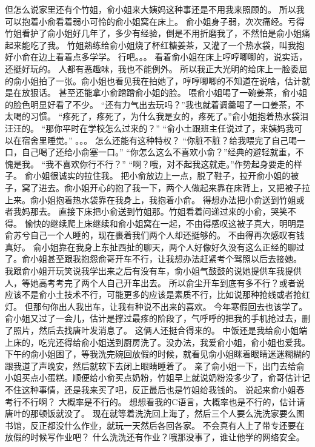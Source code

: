 但怎么说家里还有个竹姐，俞小姐来大姨妈这种事还是不用我来照顾的。
所以我可以抱着小俞看着弱小可怜的俞小姐窝在床上。
俞小姐身子弱，次次痛经。亏得竹姐看护了俞小姐好几年了，多少有经验，倒是不用折磨我了，不然怕是俞小姐痛起来能吃了我。
竹姐熟练给俞小姐烧了杯红糖姜茶，又灌了一个热水袋，叫我抱好小俞在边上看着点多学学。
行吧。。。
看着俞小姐在床上哼哼唧唧的，说实话，还挺好玩的。
人都有恶趣味，我也不能例外。
所以我正大光明的给床上一脸委屈的俞小姐拍了一张。俞小姐也看见我在拍她了，哼哼唧唧的不知道在说啥，估计就是在放狠话。
甚至还能拿小俞蹭蹭俞小姐的脸。
喂俞小姐喝了一碗姜茶，俞小姐的脸色明显好看了不少。
“还有力气出去玩吗？”我也就着调羹喝了一口姜茶，不太喝的习惯。
“疼死了，疼死了，为什么我是女的，疼死了。”俞小姐抱着热水袋泪汪汪的。
“那你平时在学校怎么过来的？”
“俞小土跟班主任说过了，来姨妈我可以在宿舍里睡觉。”
。。。
怎么还能有这种特权？
“你脏不脏？给我喂完了自己喝一口，自己喝了还给小俞塞一口。”
“你怎么这么不喜欢小俞？”经典的避轻就重，不愧是我。
“我不喜欢你行不行？”
“啊？哦，对不起我这就走。”作势起身要走的样子。
俞小姐很诚实的拉住我。
把小俞放边上一点，脱了鞋子，拉开俞小姐的被子，窝了进去。俞小姐开心的抱了我一下，两个人做起来靠在床背上，又把被子拉上来。俞小姐抱着热水袋靠在我身上，我抱着小俞。
得想办法把小俞送到竹姐或者我妈那去。
直接下床把小俞送到竹姐那。竹姐看着问递过来的小俞，哭笑不得。
愉快的继续爬上床继续和俞小姐窝在一起，不由得感叹这被子真大，明明是俞苏兮自己一个人睡的，现在裹着我们两个人却还挺够的。
不由得再次感叹有钱真好。
俞小姐靠在我身上东扯西扯的聊天，两个人好像好久没有这么正经的聊过了。俞小姐甚至跟我抱怨俞哥开车不行，让我想办法赶紧考个驾照以后去接她。
我跟俞小姐开玩笑说我学出来之后有没有车，俞小姐气鼓鼓的说她提供车我提供人，等她高考考完了两个人自己开车出去。
所以俞尘开车到底有多不行？或者说应该不是俞小土技术不行，可能更多的应该是素质不行，比如说那种抢线或者抢红灯。
但那句你出人我出车，让我有种说不出来的喜欢。
今年寒假回去也该学了。
俞小姐又过了一会儿，估计是撑过最疼的阶段了，气呼呼的把我的手机抢过去，删了照片，然后去找唐叶发消息了。
这俩人还挺合得来的。
中饭还是我给俞小姐端上床的，吃完还得给俞小姐送到厨房洗了。没办法，我爱俞小姐，俞小姐也爱我。
下午的俞小姐困了，等我洗完碗回放假的时候，就看见俞小姐眯着眼睛迷迷糊糊的跟我道了声晚安，然后就软下去闭上眼睛睡着了。
亲了俞小姐一下，出门去给俞小姐买点小蛋糕。顺便给小俞买点奶粉，竹姐早上就说奶粉没多少了，俞哥估计记不住这种事情，还是我来买了吧，反正最后也是竹姐给我钱的。
说起来俞小姐春考行不行啊？
大概率是不行的。
想想看我的C语言，大概率也是不行的，估计请唐叶的那顿饭就没了。
现在就等着洗洗回上海了，然后三个人要么洗洗家要么图书馆，反正都没什么作业，就玩一天然后各回各家。
不会真有人上了带专还要在放假的时候写作业吧？
什么洗洗还有作业？哦那没事了，谁让他学的网络安全。

